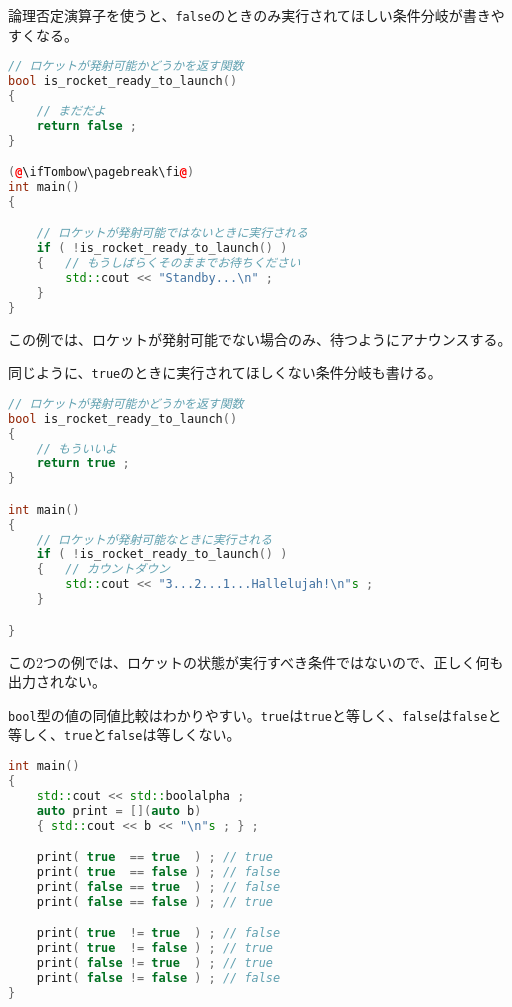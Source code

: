 論理否定演算子を使うと、\texttt{false}のときのみ実行されてほしい条件分岐が書きやすくなる。

\begin{lstlisting}[language={C++}]
// ロケットが発射可能かどうかを返す関数
bool is_rocket_ready_to_launch()
{
    // まだだよ
    return false ;
}

(@\ifTombow\pagebreak\fi@)
int main()
{

    // ロケットが発射可能ではないときに実行される
    if ( !is_rocket_ready_to_launch() )
    {   // もうしばらくそのままでお待ちください
        std::cout << "Standby...\n" ;
    }
}
\end{lstlisting}

この例では、ロケットが発射可能でない場合のみ、待つようにアナウンスする。

同じように、\texttt{true}のときに実行されてほしくない条件分岐も書ける。

\begin{lstlisting}[language={C++}]
// ロケットが発射可能かどうかを返す関数
bool is_rocket_ready_to_launch()
{
    // もういいよ
    return true ;
}

int main()
{
    // ロケットが発射可能なときに実行される
    if ( !is_rocket_ready_to_launch() )
    {   // カウントダウン
        std::cout << "3...2...1...Hallelujah!\n"s ;
    }

}
\end{lstlisting}

この2つの例では、ロケットの状態が実行すべき条件ではないので、正しく何も出力されない。


\texttt{bool}型の値の同値比較はわかりやすい。\texttt{true}は\texttt{true}と等しく、\texttt{false}は\texttt{false}と等しく、\texttt{true}と\texttt{false}は等しくない。

\begin{lstlisting}[language={C++}]
int main()
{
    std::cout << std::boolalpha ;
    auto print = [](auto b)
    { std::cout << b << "\n"s ; } ;

    print( true  == true  ) ; // true
    print( true  == false ) ; // false
    print( false == true  ) ; // false
    print( false == false ) ; // true

    print( true  != true  ) ; // false
    print( true  != false ) ; // true
    print( false != true  ) ; // true
    print( false != false ) ; // false
}
\end{lstlisting}


